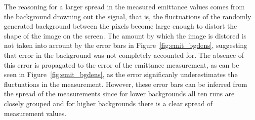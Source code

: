 The reasoning for a larger spread in the measured emittance values comes from
the background drowning out the signal, that is, the fluctuations of the
randomly generated background between the pixels become large enough to distort
the shape of the image on the screen.  The amount by which the image is distored
is not taken into account by the error bars in Figure~\ref{fig:emit_bgdens},
suggesting that error in the background was not completely accounted for. The
absence of this error is propagated to the error of the emittance measurement,
as can be seen in Figure~\ref{fig:emit_bgdens}, as the error significanly
underestimates the fluctuations in the measurement.  However, these error bars
can be inferred from the spread of the measurements since for lower backgrounds
all ten runs are closely grouped and for higher backgrounds there is a clear
spread of measurement values.




